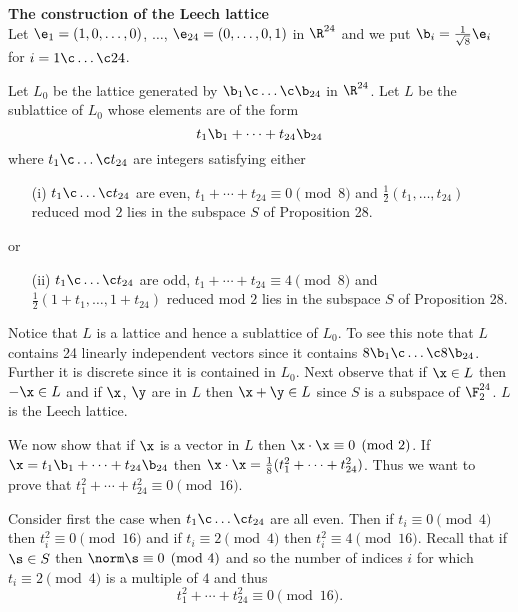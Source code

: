 \textbf{The construction of the Leech lattice} \\ %
Let $\e_1=(1,0,\dotsc,0)$, $\dotsc$, $\e_{24}=(0,\dotsc,0,1)$ in $\R^{24}$ and we put $\b_i=\frac{1}{\sqrt8}\e_i$ for $i=1\c \dotsc\c 24$.

Let $L_0$ be the lattice generated by $\b_1\c \dotsc\c \b_{24}$ in $\R^{24}$.  Let $L$ be the sublattice of $L_0$ whose elements are of the form
\[ t_1\b_1 + \dotsb + t_{24}\b_{24} \]
where $t_1\c \dotsc\c t_{24}$ are integers satisfying either
\begin{enumerate}
\item[(i)] $t_1\c \dotsc\c t_{24}$ are even, $t_1+\dotsb+t_{24}\equiv0\pmod8$ and $\frac12(t_1,\dotsc,t_{24})$ reduced mod $2$ lies in the subspace $S$ of Proposition 28.
\end{enumerate}
or
\begin{enumerate}
\item[(ii)] $t_1\c \dotsc\c t_{24}$ are odd, $t_1+\dotsb+t_{24}\equiv4\pmod8$ and $\frac12(1+t_1,\dotsc,1+t_{24})$ reduced mod $2$ lies in the subspace $S$ of Proposition 28.
\end{enumerate}

Notice that $L$ is a lattice and hence a sublattice of $L_0$.  To see this note that $L$ contains 24 linearly independent vectors since it contains $8\b_1\c \dotsc\c 8\b_{24}$.  Further it is discrete since it is contained in $L_0$.  Next observe that if $\x\in L$ then $-\x\in L$ and if $\x$, $\y$ are in $L$ then $\x+\y\in L$ since $S$ is a subspace of $\F_2^{24}$.  $L$ is the Leech lattice.

We now show that if $\x$ is a %
vector in $L$ then $\x\cdot\x\equiv0\pmod2$.  If $\x=t_1\b_1+\dotsb+t_{24}\b_{24}$ then $\x\cdot\x=\frac18(t_1^2+\dotsb+t_{24}^2)$.  Thus we want to prove that $t_1^2+\dotsb+t_{24}^2\equiv0\pmod{16}$.

Consider first the case when $t_1\c \dotsc\c t_{24}$ are all even.  Then if $t_i\equiv0\pmod4$ then $t_i^2\equiv0\pmod{16}$ and if $t_i\equiv2\pmod4$ then $t_i^2\equiv4\pmod{16}$.  Recall that if $\s\in S$ then $\norm\s\equiv0\pmod4$ and so the number of indices $i$ for which $t_i\equiv2\pmod4$ is a multiple of $4$ and thus
\[ t_1^2 + \dotsb + t_{24}^2 \equiv 0 \pmod{16} . \]

